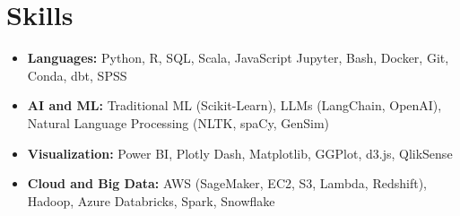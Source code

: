 \documentclass[letterpaper,11pt]{article}
\begin{document}
\section{\Large{Skills}}
\vspace{3pt}
\begin{itemize}[leftmargin=0.00in, label={}, itemsep=0pt, parsep=0pt]
    \item{
        \small{\textbf{Languages:}}
        \small{Python, R, SQL, Scala,  JavaScript} 
        \hspace{0.7cm}
        {\fontsize{10.2pt}{13pt}\selectfont{Tools:}}
        \small{Jupyter, Bash, Docker, Git, Conda, dbt, SPSS}
        }




    \item{
        \small{\textbf{AI and ML:}}
        \small{Traditional ML (Scikit-Learn), LLMs (LangChain, OpenAI), Natural Language Processing (NLTK, spaCy, GenSim) }
        }

    \item{
        \small{\textbf{Visualization:}}
        \small{Power BI, Plotly Dash, Matplotlib, GGPlot, d3.js, QlikSense}
        }
        
    \item{
        \small{\textbf{Cloud and Big Data:}}
        \small{AWS (SageMaker, EC2, S3, Lambda, Redshift), Hadoop, Azure Databricks, Spark, Snowflake}
        }

    
    
    
\end{itemize}
\end{document}
